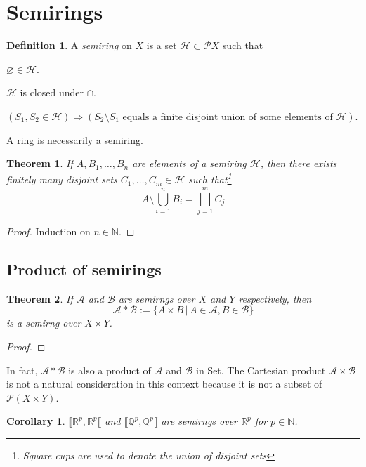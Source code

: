 \documentclass[11pt, a4paper, openany]{book}
\newtheorem{thm}{Theorem}\newtheorem{lem}{Lemma}\newtheorem{crl}{Corollary}
\theoremstyle{definition}
\newtheorem{define}{Definition}\newtheorem{exam}{Example}\newtheorem{remark}{Remark}
\newcommand{\cat}[1]{\textup{\textsf{#1}}}
\newenvironment{tight_enumerate}{\begin{enumerate}\itemsep -0.2em}{\end{enumerate}}
\begin{document}
\section{Semirings}
    \begin{define}
        A \textit{semiring} on $X$ is a set $\mathscr{H}\subset\mathscr{P}X$ such that
        \begin{tight_enumerate}
            \item $\varnothing\in\mathscr{H}$.
            \item $\mathscr{H}$ is closed under $\cap$.
            \item $(S_1,S_2\in\mathscr{H})\Longrightarrow(S_2\setminus S_1\text{ equals a finite disjoint union of some elements of }\mathscr{H})$.
        \end{tight_enumerate}
    \end{define}
    A ring is necessarily a semiring.
    \begin{thm}
        If $A,B_1,\dots,B_n$ are elements of a semiring $\mathscr{H}$, then there exists finitely many disjoint sets $C_1,\dots, C_m\in\mathscr{H}$ such that\footnote{Square cups are used to denote the union of \textit{disjoint} sets}
        \[
            A\setminus\bigcup_{i=1}^n B_i=\bigsqcup_{j=1}^mC_j
        \]
    \end{thm}
    \begin{proof}
        Induction on $n\in\mathbb{N}$.
    \end{proof}
\subsection{Product of semirings}
    \begin{thm}
        If $\mathscr{A}$ and $\mathscr{B}$ are semirngs over $X$ and $Y$ respectively, then 
            \[\mathscr{A}* \mathscr{B}:=\{A\times B\,|\,A\in\mathscr{A},B\in\mathscr{B}\}\] 
        is a semirng over $X\times Y$.
    \end{thm}
    \begin{proof}
        
    \end{proof}
    In fact, $\mathscr{A}* \mathscr{B}$ is also a product of $\mathscr{A}$ and $\mathscr{B}$ in \cat{Set}. The Cartesian product $\mathscr{A}\times \mathscr{B}$ is not a natural consideration in this context because it is not a subset of $\mathscr{P}(X\times Y)$.
    \begin{crl}
        $\llbracket \mathbb{R}^p,\mathbb{R}^p\llbracket$ and $\llbracket \mathbb{Q}^p,\mathbb{Q}^p\llbracket$ are semirngs over $\mathbb{R}^p$ for $p\in\mathbb{N}$.
    \end{crl}
\end{document}

